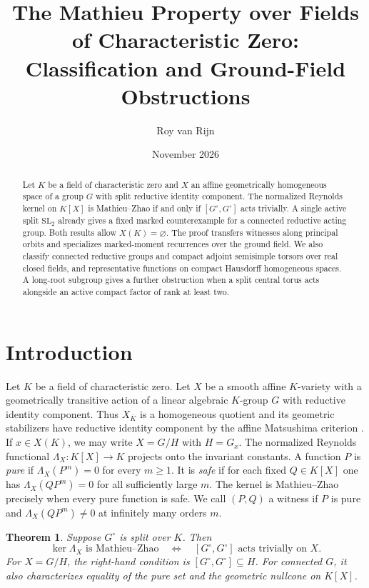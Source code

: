 \documentclass[11pt]{article}
\title{The Mathieu Property over Fields of Characteristic Zero:\\
\large Classification and Ground-Field Obstructions}
\author{Roy van Rijn}
\date{November 2026}
\newtheorem{theorem}{Theorem}[section]
\newcommand{\SL}{\mathrm{SL}}
\begin{document}
\maketitle

\begin{abstract}
Let \(K\) be a field of characteristic zero and \(X\) an affine geometrically
homogeneous space of a group \(G\) with split reductive identity component.
The normalized Reynolds kernel on \(K[X]\) is Mathieu--Zhao if and only if
\([G^\circ,G^\circ]\) acts trivially. A single active split \(\SL_2\) already
gives a fixed marked counterexample for a connected reductive acting group.
Both results allow \(X(K)=\varnothing\). The proof transfers witnesses along
principal orbits and specializes marked-moment recurrences over the ground
field. We also classify connected reductive groups and compact adjoint
semisimple torsors over real closed fields, and representative functions
on compact Hausdorff homogeneous spaces. A long-root subgroup gives a
further obstruction when a split central torus acts alongside an active
compact factor of rank at least two.
\end{abstract}

\section{Introduction}

Let \(K\) be a field of characteristic zero. Let \(X\) be a smooth affine
\(K\)-variety with a geometrically transitive action of a linear algebraic
\(K\)-group \(G\) with reductive identity component. Thus \(X_{\overline K}\)
is a homogeneous quotient and its geometric stabilizers have reductive
identity component by the affine Matsushima criterion \cite{Matsushima}.
If \(x\in X(K)\), we may write \(X=G/H\) with \(H=G_x\).
The normalized Reynolds functional \(\Lambda_X:K[X]\to K\) projects onto
the invariant constants. A function \(P\) is \emph{pure} if
\(\Lambda_X(P^m)=0\) for every \(m\ge1\). It is \emph{safe} if for each
fixed \(Q\in K[X]\) one has \(\Lambda_X(QP^m)=0\) for all sufficiently
large \(m\). The kernel is Mathieu--Zhao precisely when every pure
function is safe. We call \((P,Q)\) a witness if \(P\) is pure and
\(\Lambda_X(QP^m)\ne0\) at infinitely many orders \(m\).

\begin{theorem}\label{thm:main}
Suppose \(G^\circ\) is split over \(K\). Then
\[
 \ker\Lambda_X\text{ is Mathieu--Zhao}
 \quad\Longleftrightarrow\quad
 [G^\circ,G^\circ]\text{ acts trivially on }X.
\]
For \(X=G/H\), the right-hand condition is
\([G^\circ,G^\circ]\subseteq H\). For connected \(G\), it also
characterizes equality of the pure set and the geometric nullcone on
\(K[X]\).
\end{theorem}
\end{document}
